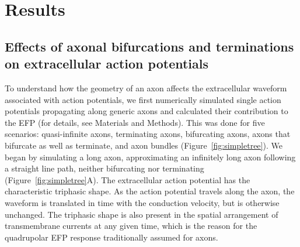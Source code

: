 \documentclass[]{elife}
\begin{document}
\section{Results}\label{results}

\subsection{Effects of axonal bifurcations and terminations on
extracellular action
potentials}\label{effects-of-axonal-bifurcations-and-terminations-on-extracellular-action-potentials}

To understand how the geometry of an axon affects the extracellular
waveform associated with action potentials, we first numerically
simulated single action potentials propagating along generic axons and
calculated their contribution to the EFP (for details, see Materials and
Methods). This was done for five scenarios: quasi-infinite axons,
terminating axons, bifurcating axons, axons that bifurcate as well as
terminate, and axon bundles (Figure~\ref{fig:simpletree}). We began by
simulating a long axon, approximating an infinitely long axon following
a straight line path, neither bifurcating nor terminating
(Figure~\ref{fig:simpletree}A). The extracellular action potential has
the characteristic triphasic shape. As the action potential travels
along the axon, the waveform is translated in time with the conduction
velocity, but is otherwise unchanged. The triphasic shape is also
present in the spatial arrangement of transmembrane currents at any
given time, which is the reason for the quadrupolar EFP response
traditionally assumed for axons.
\end{document}
